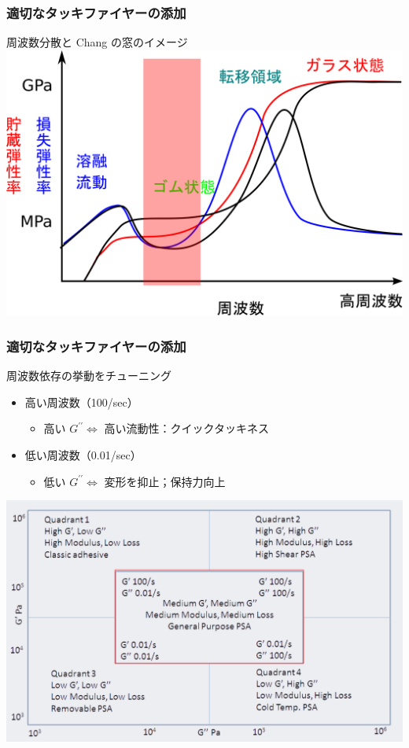 \documentclass[unicode,12pt]{beamer}%
\begin{document}
\begin{frame}
	\frametitle{適切なタッキファイヤーの添加}
		\large{\alert{周波数分散と Chang の窓のイメージ}}
		\vspace{5mm}
			\centering
				\includegraphics[width=.8\textwidth]{dynamic_ViscoElast_Freq_rubber.png}
\end{frame}


\begin{frame}
	\frametitle{適切なタッキファイヤーの添加}
		\begin{alertblock}{周波数依存の挙動をチューニング}
			\begin{itemize}
				\item 高い周波数（100/sec）
				\begin{itemize}
					\item 高い $G^{\prime \prime} \Leftrightarrow$ 高い流動性：クイックタッキネス
				\end{itemize}
				\item 低い周波数（0.01/sec）
				\begin{itemize}
					\item 低い $G^{\prime \prime} \Leftrightarrow$ 変形を抑止；保持力向上
				\end{itemize}
			\end{itemize}

			\vspace{3mm}
			\centering
				\includegraphics[width=.5\textwidth]{ChangFrequencies_2.png}
		\end{alertblock}	
\end{frame}
\end{document}
